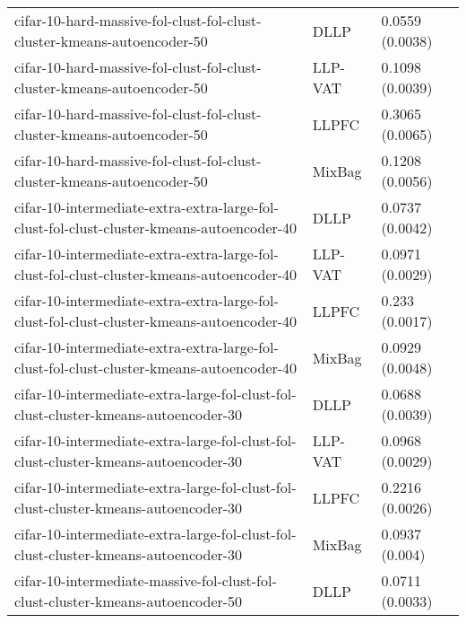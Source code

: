 \begin{longtable}{lll}
                                      cifar-10-hard-massive-fol-clust-fol-clust-cluster-kmeans-autoencoder-50 &      DLLP &                           0.0559 (0.0038) \\
                                      cifar-10-hard-massive-fol-clust-fol-clust-cluster-kmeans-autoencoder-50 &   LLP-VAT &                           0.1098 (0.0039) \\
                                      cifar-10-hard-massive-fol-clust-fol-clust-cluster-kmeans-autoencoder-50 &     LLPFC &                           0.3065 (0.0065) \\
                                      cifar-10-hard-massive-fol-clust-fol-clust-cluster-kmeans-autoencoder-50 &    MixBag &                           0.1208 (0.0056) \\
                    cifar-10-intermediate-extra-extra-large-fol-clust-fol-clust-cluster-kmeans-autoencoder-40 &      DLLP &                           0.0737 (0.0042) \\
                    cifar-10-intermediate-extra-extra-large-fol-clust-fol-clust-cluster-kmeans-autoencoder-40 &   LLP-VAT &                           0.0971 (0.0029) \\
                    cifar-10-intermediate-extra-extra-large-fol-clust-fol-clust-cluster-kmeans-autoencoder-40 &     LLPFC &                            0.233 (0.0017) \\
                    cifar-10-intermediate-extra-extra-large-fol-clust-fol-clust-cluster-kmeans-autoencoder-40 &    MixBag &                           0.0929 (0.0048) \\
                          cifar-10-intermediate-extra-large-fol-clust-fol-clust-cluster-kmeans-autoencoder-30 &      DLLP &                           0.0688 (0.0039) \\
                          cifar-10-intermediate-extra-large-fol-clust-fol-clust-cluster-kmeans-autoencoder-30 &   LLP-VAT &                           0.0968 (0.0029) \\
                          cifar-10-intermediate-extra-large-fol-clust-fol-clust-cluster-kmeans-autoencoder-30 &     LLPFC &                           0.2216 (0.0026) \\
                          cifar-10-intermediate-extra-large-fol-clust-fol-clust-cluster-kmeans-autoencoder-30 &    MixBag &                            0.0937 (0.004) \\
                              cifar-10-intermediate-massive-fol-clust-fol-clust-cluster-kmeans-autoencoder-50 &      DLLP &                           0.0711 (0.0033) \\

\end{longtable}
